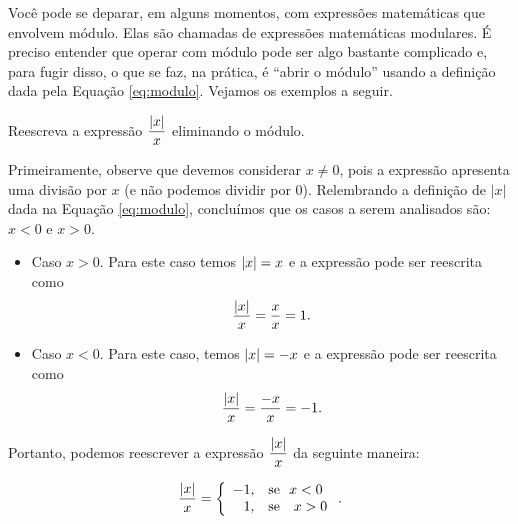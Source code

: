 \begin{prop}
\begin{enumerate}
\begin{multicols}{2}
\end{multicols}
\end{enumerate}
\end{prop}

 Você pode se deparar, em alguns momentos, com expressões matemáticas que envolvem módulo. Elas são chamadas de expressões matemáticas modulares. É preciso entender que operar com módulo pode ser algo bastante complicado e, para fugir disso, o que se faz, na prática, é ``abrir o módulo'' usando a definição dada pela Equação \ref{eq:modulo}. Vejamos os exemplos a seguir.

 \begin{exem}
  Reescreva a expressão $\dfrac{\left|x\right|}{x}$ eliminando o módulo.

  Primeiramente, observe que devemos considerar $x \neq 0$, pois a expressão apresenta uma divisão por $x$ (e não podemos dividir por 0). Relembrando a definição de $|x|$ dada na Equação \ref{eq:modulo}, concluímos que os casos a serem analisados são: $x<0$ e $x>0$.

  \begin{itemize}
   \item Caso $x> 0$. Para este caso temos $\left|x\right|= x$ e a expressão pode ser reescrita como
\begin{equation*}
\dfrac{\left|x\right|}{x}=\dfrac{x}{x}= 1.
\end{equation*}
   \item Caso $x< 0$. Para este caso, temos $\left|x\right|= -x$ e a expressão pode ser reescrita como
\begin{equation*}
\dfrac{\left|x\right|}{x}=\dfrac{-x}{x}= -1.
\end{equation*}
  \end{itemize}

 Portanto, podemos reescrever a expressão $\dfrac{\left|x\right|}{x}$ da seguinte maneira:

 \begin{equation*}
   \frac{\left|x\right|}{x} = \left\{ \begin{array}{rl}
        -1, & \text{se} \ \ x< 0 \\
         1, & \text{se } \ \ x> 0
     \end{array}\right..
 \end{equation*}
\end{exem}
 
